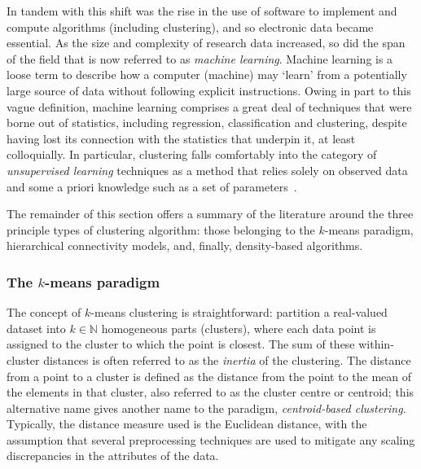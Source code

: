 In tandem with this shift was the rise in the use of software to implement and
compute algorithms (including clustering), and so electronic data became
essential. As the size and complexity of research data increased, so did the
span of the field that is now referred to as \emph{machine learning}. Machine
learning is a loose term to describe how a computer (machine) may `learn' from a
potentially large source of data without following explicit instructions. Owing
in part to this vague definition, machine learning comprises a great deal of
techniques that were borne out of statistics, including regression,
classification and clustering, despite having lost its connection with the
statistics that underpin it, at least colloquially. In particular, clustering
falls comfortably into the category of \emph{unsupervised learning} techniques
as a method that relies solely on observed data and some a priori
knowledge such as a set of parameters~\cite{Dayan1999}.

The remainder of this section offers a summary of the literature around the
three principle types of clustering algorithm: those belonging to the
\(k\)-means paradigm, hierarchical connectivity models, and, finally,
density-based algorithms.

\subsubsection{The \(k\)-means paradigm}\label{subsubsec:kmeans}

The concept of \(k\)-means clustering is straightforward: partition a
real-valued dataset into \(k \in \mathbb N\) homogeneous parts (clusters), where
each data point is assigned to the cluster to which the point is closest. The
sum of these within-cluster distances is often referred to as the \emph{inertia}
of the clustering. The distance from a point to a cluster is defined as the
distance from the point to the mean of the elements in that cluster, also
referred to as the cluster centre or centroid; this alternative name gives
another name to the paradigm, \emph{centroid-based clustering}. Typically, the
distance measure used is the Euclidean distance, with the assumption that
several preprocessing techniques are used to mitigate any scaling discrepancies
in the attributes of the data.

